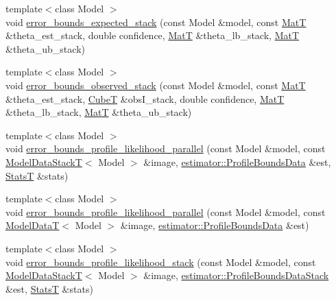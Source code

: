 \begin{DoxyCompactItemize}
{\footnotesize template$<$class Model $>$ }\\void \hyperlink{namespacemappel_1_1methods_1_1openmp_ac9aac4b2df768e850bee73aa5c7f2686}{error\+\_\+bounds\+\_\+expected\+\_\+stack} (const Model \&model, const \hyperlink{namespacemappel_a7091ab87c528041f7e2027195fad8915}{MatT} \&theta\+\_\+est\+\_\+stack, double confidence, \hyperlink{namespacemappel_a7091ab87c528041f7e2027195fad8915}{MatT} \&theta\+\_\+lb\+\_\+stack, \hyperlink{namespacemappel_a7091ab87c528041f7e2027195fad8915}{MatT} \&theta\+\_\+ub\+\_\+stack)
\item 
{\footnotesize template$<$class Model $>$ }\\void \hyperlink{namespacemappel_1_1methods_1_1openmp_a82a1f1d04ea0a21f003b35fad25a3442}{error\+\_\+bounds\+\_\+observed\+\_\+stack} (const Model \&model, const \hyperlink{namespacemappel_a7091ab87c528041f7e2027195fad8915}{MatT} \&theta\+\_\+est\+\_\+stack, \hyperlink{namespacemappel_ab2afab4e6c8805e83946670d882768c2}{CubeT} \&obs\+I\+\_\+stack, double confidence, \hyperlink{namespacemappel_a7091ab87c528041f7e2027195fad8915}{MatT} \&theta\+\_\+lb\+\_\+stack, \hyperlink{namespacemappel_a7091ab87c528041f7e2027195fad8915}{MatT} \&theta\+\_\+ub\+\_\+stack)
\item 
{\footnotesize template$<$class Model $>$ }\\void \hyperlink{namespacemappel_1_1methods_1_1openmp_ad79d4ade28ab7a6369e7215a6e317692}{error\+\_\+bounds\+\_\+profile\+\_\+likelihood\+\_\+parallel} (const Model \&model, const \hyperlink{namespacemappel_aaeb6665bc57476dd93c2df6ad8bc4768}{Model\+Data\+StackT}$<$ Model $>$ \&image, \hyperlink{structmappel_1_1estimator_1_1ProfileBoundsData}{estimator\+::\+Profile\+Bounds\+Data} \&est, \hyperlink{namespacemappel_a04ab395b0cf82c4ce68a36b2212649a5}{StatsT} \&stats)
\item 
{\footnotesize template$<$class Model $>$ }\\void \hyperlink{namespacemappel_1_1methods_1_1openmp_a0fc866281e3dbe1810951b048485be95}{error\+\_\+bounds\+\_\+profile\+\_\+likelihood\+\_\+parallel} (const Model \&model, const \hyperlink{namespacemappel_a97f050df953605381ae9c901c3b125f1}{Model\+DataT}$<$ Model $>$ \&image, \hyperlink{structmappel_1_1estimator_1_1ProfileBoundsData}{estimator\+::\+Profile\+Bounds\+Data} \&est)
\item 
{\footnotesize template$<$class Model $>$ }\\void \hyperlink{namespacemappel_1_1methods_1_1openmp_ab915be56d7945a80e2d72595c5c6cfb9}{error\+\_\+bounds\+\_\+profile\+\_\+likelihood\+\_\+stack} (const Model \&model, const \hyperlink{namespacemappel_aaeb6665bc57476dd93c2df6ad8bc4768}{Model\+Data\+StackT}$<$ Model $>$ \&image, \hyperlink{structmappel_1_1estimator_1_1ProfileBoundsDataStack}{estimator\+::\+Profile\+Bounds\+Data\+Stack} \&est, \hyperlink{namespacemappel_a04ab395b0cf82c4ce68a36b2212649a5}{StatsT} \&stats)

\end{DoxyCompactItemize}
